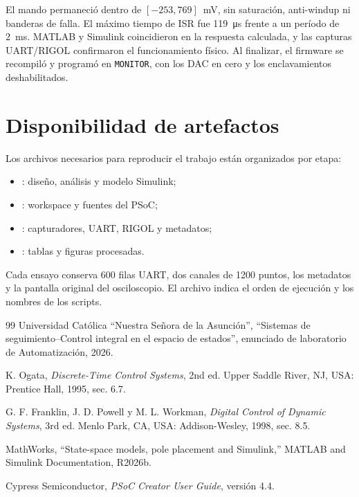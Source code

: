 \documentclass[conference]{IEEEtran}
\begin{document}
El mando permaneció dentro de $[-253,769]$~mV, sin saturación, anti-windup ni banderas de falla. El máximo tiempo de ISR fue \SI{119}{\micro s} frente a un período de \SI{2}{ms}. MATLAB y Simulink coincidieron en la respuesta calculada, y las capturas UART/RIGOL confirmaron el funcionamiento físico. Al finalizar, el firmware se recompiló y programó en \texttt{MONITOR}, con los DAC en cero y los enclavamientos deshabilitados.

\section*{Disponibilidad de artefactos}
Los archivos necesarios para reproducir el trabajo están organizados por etapa:
\begin{itemize}
\item {}: diseño, análisis y modelo Simulink;
\item {}: workspace y fuentes del PSoC;
\item {}: capturadores, UART, RIGOL y metadatos;
\item {}: tablas y figuras procesadas.
\end{itemize}
Cada ensayo conserva 600 filas UART, dos canales de 1200 puntos, los metadatos y la pantalla original del osciloscopio. El archivo  indica el orden de ejecución y los nombres de los scripts.

\begin{thebibliography}{99}
Universidad Católica ``Nuestra Señora de la Asunción'', ``Sistemas de seguimiento--Control integral en el espacio de estados'', enunciado de laboratorio de Automatización, 2026.

K. Ogata, \emph{Discrete-Time Control Systems}, 2nd ed. Upper Saddle River, NJ, USA: Prentice Hall, 1995, sec. 6.7.

G. F. Franklin, J. D. Powell y M. L. Workman, \emph{Digital Control of Dynamic Systems}, 3rd ed. Menlo Park, CA, USA: Addison-Wesley, 1998, sec. 8.5.

MathWorks, ``State-space models, pole placement and Simulink,'' MATLAB and Simulink Documentation, R2026b.

Cypress Semiconductor, \emph{PSoC Creator User Guide}, versión 4.4.
\end{thebibliography}

\end{document}

